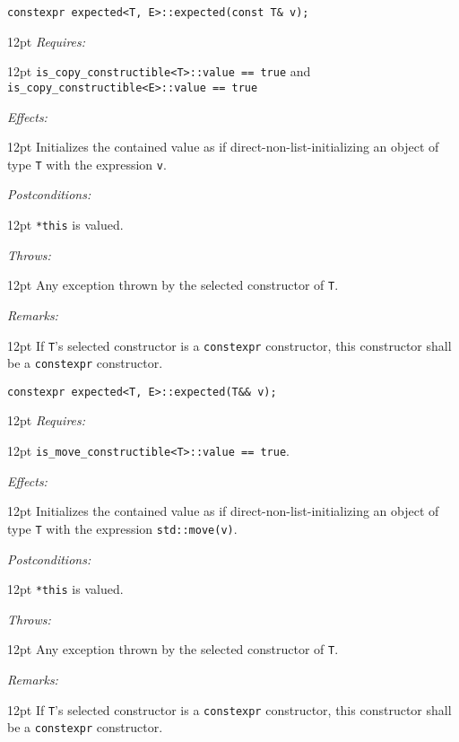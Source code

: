 \documentclass[a4paper,10pt]{article}
\newcommand{\cpp}[1]{\lstinline{#1}}
\newcommand{\wordingItem}[1]{\noindent\textit{#1:}}
\newenvironment{wordingTextItem}[1]{\wordingItem{#1}\vspace{7pt}\noindent\begin{adjustwidth}{12pt}{}}{\vspace{7pt}\end{adjustwidth}}
\newenvironment{wordingPara}{\begin{adjustwidth}{12pt}{}}{\end{adjustwidth}}
\begin{document}
\begin{lstlisting}[xleftmargin=0pt]
constexpr expected<T, E>::expected(const T& v);
\end{lstlisting}
\begin{wordingPara}
\begin{wordingTextItem}{Requires}
\cpp{is_copy_constructible<T>::value == true} and\\
\cpp{is_copy_constructible<E>::value == true}
\end{wordingTextItem}
\begin{wordingTextItem}{Effects}
Initializes the contained value as if direct-non-list-initializing an object of type \cpp{T} with the expression \cpp{v}.
\end{wordingTextItem}
\begin{wordingTextItem}{Postconditions}
\cpp{*this} is valued.
\end{wordingTextItem}
\begin{wordingTextItem}{Throws}
Any exception thrown by the selected constructor of \cpp{T}.
\end{wordingTextItem}
\begin{wordingTextItem}{Remarks}
If \cpp{T}'s selected constructor is a \cpp{constexpr} constructor, this constructor shall be a \cpp{constexpr} constructor.
\end{wordingTextItem}
\end{wordingPara}

\begin{lstlisting}[xleftmargin=0pt]
constexpr expected<T, E>::expected(T&& v); 
\end{lstlisting}
\begin{wordingPara}
\begin{wordingTextItem}{Requires}
\cpp{is_move_constructible<T>::value == true}.
\end{wordingTextItem}
\begin{wordingTextItem}{Effects}
Initializes the contained value as if direct-non-list-initializing an object of type \cpp{T} with the expression \cpp{std::move(v)}.
\end{wordingTextItem}
\begin{wordingTextItem}{Postconditions}
\cpp{*this} is valued.
\end{wordingTextItem}
\begin{wordingTextItem}{Throws}
Any exception thrown by the selected constructor of \cpp{T}.
\end{wordingTextItem}
\begin{wordingTextItem}{Remarks}
If \cpp{T}'s selected constructor is a \cpp{constexpr} constructor, this constructor shall be a \cpp{constexpr} constructor.
\end{wordingTextItem}
\end{wordingPara}
\end{document}
